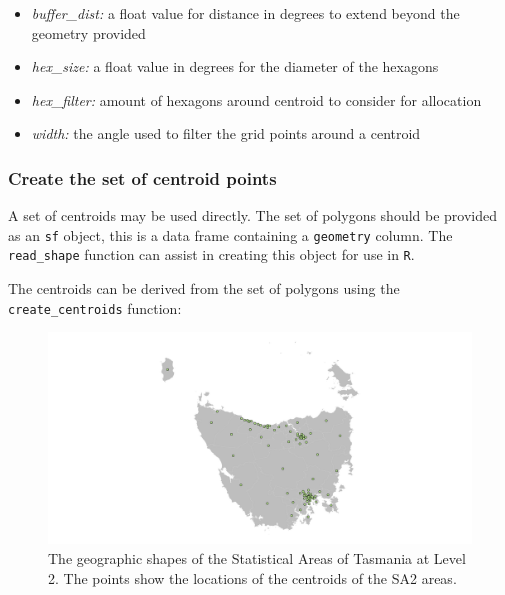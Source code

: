 \documentclass{monashthesis}
\begin{document}
\begin{itemize}
\tightlist
\item
  \emph{buffer\_dist:} a float value for distance in degrees to extend beyond the geometry provided
\item
  \emph{hex\_size:} a float value in degrees for the diameter of the hexagons
\item
  \emph{hex\_filter:} amount of hexagons around centroid to consider for allocation
\item
  \emph{width:} the angle used to filter the grid points around a centroid
\end{itemize}

\hypertarget{create-the-set-of-centroid-points}{%
\subsubsection{Create the set of centroid points}\label{create-the-set-of-centroid-points}}

A set of centroids may be used directly. The set of polygons should be provided as an \texttt{sf} object, this is a data frame containing a \texttt{geometry} column. The \texttt{read\_shape} function can assist in creating this object for use in \texttt{R}.

The centroids can be derived from the set of polygons using the \texttt{create\_centroids} function:

\begin{Shaded}
\begin{Highlighting}[]
\StringTok{ }\NormalTok{(} \NormalTok{)}
\end{Highlighting}
\end{Shaded}

\begin{figure}[H]
\centering
\includegraphics[width=16cm]{figures/03-algorithm/1centroids.png}
\caption{\label{fig:centroids_plot}The geographic shapes of the Statistical Areas of Tasmania at Level 2. The points show the locations of the centroids of the SA2 areas.}
\end{figure}
\end{document}
